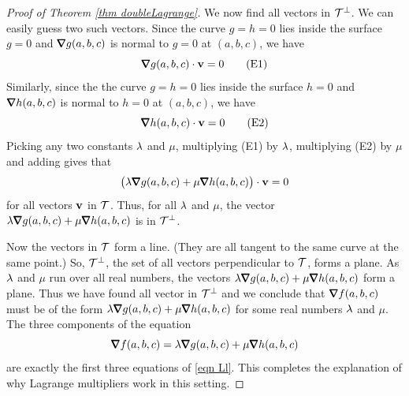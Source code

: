 \begin{proof}[Proof of Theorem \ref{thm doubleLagrange}]
We now find all vectors in $\mathcal{T}^\perp$. We can easily guess two such vectors. 
Since the curve $g=h=0$ lies inside the surface $g=0$ and 
$\vnabla g(a,b,c)$
is normal to $g=0$ at $(a,b,c)$, we have
\begin{equation*}
\vnabla g(a,b,c) \cdot \vv=0
\tag{E1}\end{equation*}
Similarly, since the the curve $g=h=0$ lies inside the surface $h=0$ 
and $\vnabla h(a,b,c)$ is normal to $h=0$ at $(a,b,c)$, we have
\begin{equation*}
\vnabla h(a,b,c) \cdot \vv=0
\tag{E2}\end{equation*}
Picking any two constants $\lambda$ and $\mu$, multiplying (E1)
by $\lambda$, multiplying (E2) by $\mu$ and adding gives that
\begin{equation*}
\big(\la\vnabla g(a,b,c)
     +\mu\vnabla h(a,b,c)\big) \cdot \vv=0
\end{equation*}
for all vectors $\mathbf{v}$  in $\mathcal{T}$. Thus, for all $\lambda$ and $\mu$, the
vector $\la\vnabla g(a,b,c)+\mu\vnabla h(a,b,c)$ 
is in $\mathcal{T}^\perp$.

Now the vectors in $\mathcal{T}$ form a line. (They are all tangent to the same 
curve at the same point.) So, $\mathcal{T}^\perp$, the set of all vectors 
perpendicular to $\mathcal{T}$,  forms a plane. As $\lambda$ and $\mu$ run over all 
real numbers, the vectors $\la\vnabla g(a,b,c)
+\mu\vnabla h(a,b,c)$  form a plane. Thus we have found all vector
in $\mathcal{T}^\perp$ and we conclude that $\vnabla f(a,b,c)$ must be
of the form $\la\vnabla g(a,b,c)+\mu\vnabla h(a,b,c)$ 
for some real numbers $\lambda$ and $\mu$. The three components of the
equation
$$
\vnabla f(a,b,c)
=\la\vnabla g(a,b,c)+\mu\vnabla h(a,b,c)
$$
are exactly the first three equations of \eqref{eqn Ll}. This completes the
explanation of why Lagrange multipliers work in this setting.
\end{proof}


